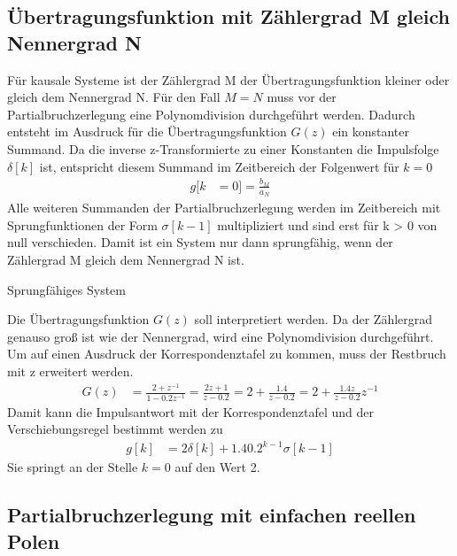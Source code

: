 \subsection{Übertragungsfunktion mit Zählergrad M gleich Nennergrad N}\label{sec:uxfcbertragungsfunktion-mit-zuxe4hlergrad-m-gleich-nennergrad-n}

Für kausale Systeme ist der Zählergrad M der Übertragungsfunktion kleiner oder gleich dem Nennergrad N. Für den Fall \(M = N\) muss vor der Partialbruchzerlegung eine Polynomdivision durchgeführt werden. Dadurch entsteht im Ausdruck für die Übertragungsfunktion \(G(z)\) ein konstanter Summand. Da die inverse z-Transformierte zu einer Konstanten die Impulsfolge \(δ[k]\) ist, entspricht diesem Summand im Zeitbereich der Folgenwert für \(k = 0\)
\begin{align}
g[ k &= 0] = \frac{b_{M}}{a_{N}} \label{eq:6.87}
\end{align}
Alle weiteren Summanden der Partialbruchzerlegung werden im Zeitbereich mit Sprungfunktionen der Form \(σ[k - 1]\) multipliziert und sind erst für k \textgreater{} 0 von null verschieden. Damit ist ein System nur dann sprungfähig, wenn der Zählergrad M gleich dem Nennergrad N ist.

\begin{example}{Sprungfähiges System}
\label{example:beispiel-sprungfuxe4higes-system}

Die Übertragungsfunktion \(G(z)\) soll interpretiert werden. Da der Zählergrad genauso groß ist wie der Nennergrad, wird eine Polynomdivision durchgeführt. Um auf einen Ausdruck der Korrespondenztafel zu kommen, muss der Restbruch mit z erweitert werden.
\begin{align*}
G(z) &= \frac{2 + z^{- 1}}{1 - 0.2  z^{- 1}} = \frac{2  z + 1}{z - 0.2} = 2 + \frac{1.4}{z - 0.2} = 2 + \frac{1.4  z}{z - 0.2}  z^{- 1} 
\end{align*}
Damit kann die Impulsantwort mit der Korrespondenztafel und der Verschiebungsregel bestimmt werden zu
\begin{align*}
g[ k] &= 2  \delta[ k] + 1.4  0.2^{k - 1}  \sigma[ k - 1] 
\end{align*}
Sie springt an der Stelle \(k = 0\) auf den Wert 2.

\end{example}

\subsection{Partialbruchzerlegung mit einfachen reellen Polen}\label{sec:partialbruchzerlegung-mit-einfachen-reellen-polen}

